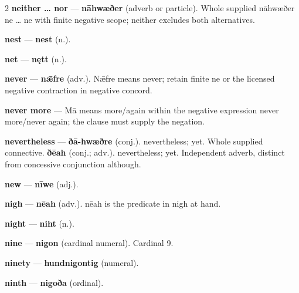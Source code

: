 \begin{multicols}{2}
\textbf{neither … nor} — \textbf{nāhwæðer} (adverb or particle). Whole supplied nāhwæðer ne … ne with finite negative scope; neither excludes both alternatives.\par
\textbf{nest} — \textbf{nest} (n.).\par
\textbf{net} — \textbf{nętt} (n.).\par
\textbf{never} — \textbf{nǣfre} (adv.). Nǣfre means never; retain finite ne or the licensed negative contraction in negative concord.\par
\textbf{never more} — Mā means more/again within the negative expression never more/never again; the clause must supply the negation.\par
\textbf{nevertheless} — \textbf{ðā-hwæðre} (conj.). nevertheless; yet. Whole supplied connective. \textbf{ðēah} (conj.; adv.). nevertheless; yet. Independent adverb, distinct from concessive conjunction although.\par
\textbf{new} — \textbf{nīwe} (adj.).\par
\textbf{nigh} — \textbf{nēah} (adv.). nēah is the predicate in nigh at hand.\par
\textbf{night} — \textbf{niht} (n.).\par
\textbf{nine} — \textbf{nigon} (cardinal numeral). Cardinal 9.\par
\textbf{ninety} — \textbf{hundnigontig} (numeral).\par
\textbf{ninth} — \textbf{nigoða} (ordinal).\par

\end{multicols}
